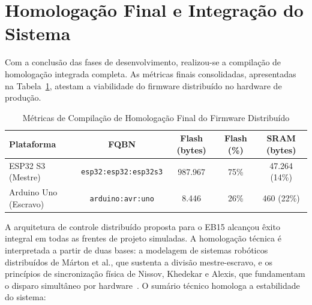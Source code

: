 \section{Homologação Final e Integração do Sistema}
\label{sec:dev_homologacao}

Com a conclusão das fases de desenvolvimento, realizou-se a compilação de homologação integrada completa. As métricas finais consolidadas, apresentadas na Tabela~\ref{tab:compilacao_final}, atestam a viabilidade do firmware distribuído no hardware de produção.

\begin{table}[h!]
\centering
\caption{Métricas de Compilação de Homologação Final do Firmware Distribuído}
\label{tab:compilacao_final}
\begin{tabular}{|l|c|c|c|c|}
\hline
\textbf{Plataforma} & \textbf{FQBN} & \textbf{Flash (bytes)} & \textbf{Flash (\%)} & \textbf{SRAM (bytes)} \\ \hline
ESP32 S3 (Mestre) & \texttt{esp32:esp32:esp32s3} & 987.967 & 75\% & 47.264 (14\%) \\ \hline
Arduino Uno (Escravo) & \texttt{arduino:avr:uno} & 8.446 & 26\% & 460 (22\%) \\ \hline
\end{tabular}
\end{table}

A arquitetura de controle distribuído proposta para o EB15 alcançou êxito integral em todas as frentes de projeto simuladas. A homologação técnica é interpretada a partir de duas bases: a modelagem de sistemas robóticos distribuídos de Márton et al., que sustenta a divisão mestre-escravo, e os princípios de sincronização física de Nissov, Khedekar e Alexis, que fundamentam o disparo simultâneo por hardware~\cite{marton2009distributed, nissov2025simultaneous}. O sumário técnico homologa a estabilidade do sistema:

